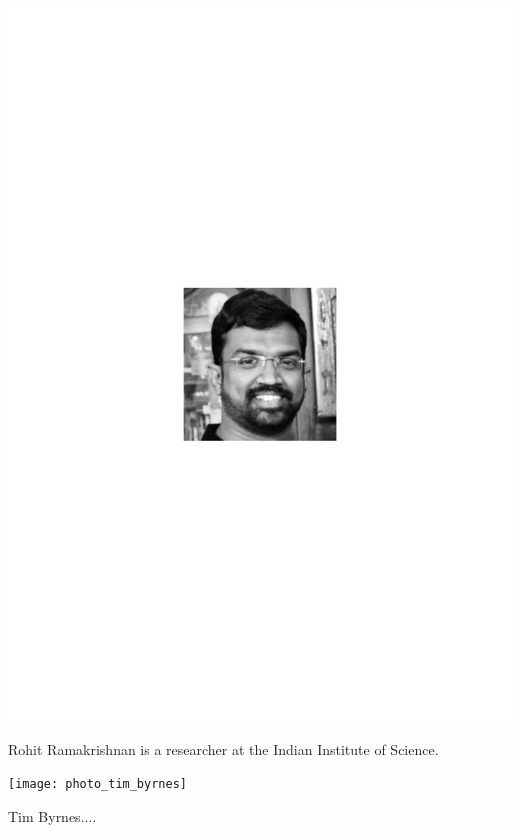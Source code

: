 \includegraphics[width=\columnwidth]{photo_rohit_ramakrishnan}

Rohit Ramakrishnan is a researcher at the Indian Institute of Science.


\texttt{[image: photo\_tim\_byrnes]}

Tim Byrnes....


